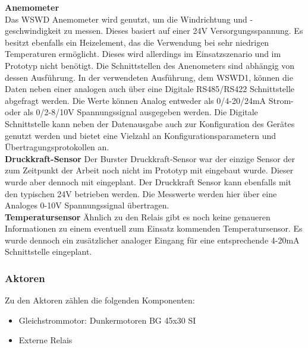\noindent\textbf{Anemometer}\\
Das WSWD Anemometer wird genutzt, um die Windrichtung und -geschwindigkeit zu messen. Dieses basiert auf einer 24V Versorgungsspannung. Es besitzt ebenfalls ein Heizelement, das die Verwendung bei sehr niedrigen Temperaturen ermöglicht. Dieses wird allerdings im Einsatzszenario und im Prototyp nicht benötigt. Die Schnittstellen des Anenometers sind abhängig von dessen Ausführung. In der verwendeten Ausführung, dem WSWD1, können die Daten neben einer analogen auch über eine Digitale RS485/RS422 Schnittstelle abgefragt werden. Die Werte können Analog entweder als 0/4-20/24mA Strom- oder als 0/2-8/10V Spannungssignal ausgegeben werden. Die Digitale Schnittstelle kann neben der Datenausgabe auch zur Konfiguration des Gerätes genutzt werden und bietet eine Vielzahl an Konfigurationsparametern und Übertragungsprotokollen an.\\

\noindent\textbf{Druckkraft-Sensor}\newline
Der Burster Druckkraft-Sensor war der einzige Sensor der zum Zeitpunkt der Arbeit noch nicht im Prototyp mit eingebaut wurde. Dieser wurde aber dennoch mit eingeplant. Der Druckkraft Sensor kann ebenfalls mit den typischen 24V betrieben werden. Die Messwerte werden hier über eine Analoges 0-10V Spannungssignal übertragen.\\

\noindent\textbf{Temperatursensor}\newline
Ähnlich zu den Relais gibt es noch keine genaueren Informationen zu einem eventuell zum Einsatz kommenden Temperatursensor. Es wurde dennoch ein zusätzlicher analoger Eingang für eine entsprechende 4-20mA Schnittstelle eingeplant.\\
\subsubsection{Aktoren}
Zu den Aktoren zählen die folgenden Komponenten:
\begin{itemize}
	\item Gleichstrommotor: Dunkermotoren BG 45x30 SI
	\item Externe Relais
\end{itemize}

